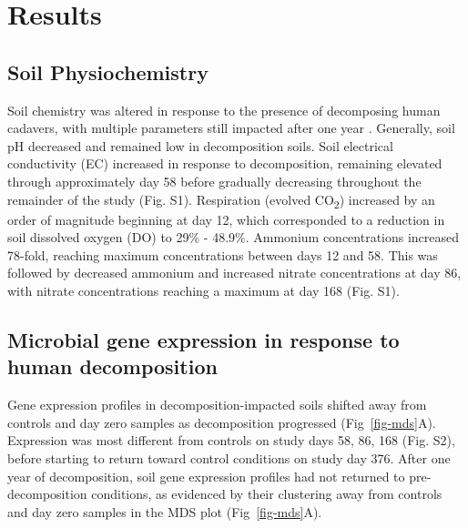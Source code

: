 \documentclass[
  sn-nature,
  lineno, referee]{sn-jnl}
\begin{document}
\section{Results}\label{results}

\subsection{Soil Physiochemistry}\label{soil-physiochemistry}

Soil chemistry was altered in response to the presence of decomposing
human cadavers, with multiple parameters still impacted after one year
\citep{taylor_transient_2024}. Generally, soil pH decreased and remained
low in decomposition soils. Soil electrical conductivity (EC) increased
in response to decomposition, remaining elevated through approximately
day 58 before gradually decreasing throughout the remainder of the study
(Fig. S1). Respiration (evolved CO\textsubscript{2}) increased by an
order of magnitude beginning at day 12, which corresponded to a
reduction in soil dissolved oxygen (DO) to 29\% - 48.9\%. Ammonium
concentrations increased 78-fold, reaching maximum concentrations
between days 12 and 58. This was followed by decreased ammonium and
increased nitrate concentrations at day 86, with nitrate concentrations
reaching a maximum at day 168 (Fig. S1).

\subsection{Microbial gene expression in response to human
decomposition}\label{microbial-gene-expression-in-response-to-human-decomposition}

Gene expression profiles in decomposition-impacted soils shifted away
from controls and day zero samples as decomposition progressed
(Fig~\ref{fig-mds}A). Expression was most different from controls on
study days 58, 86, 168 (Fig. S2), before starting to return toward
control conditions on study day 376. After one year of decomposition,
soil gene expression profiles had not returned to pre-decomposition
conditions, as evidenced by their clustering away from controls and day
zero samples in the MDS plot (Fig~\ref{fig-mds}A).
\end{document}
